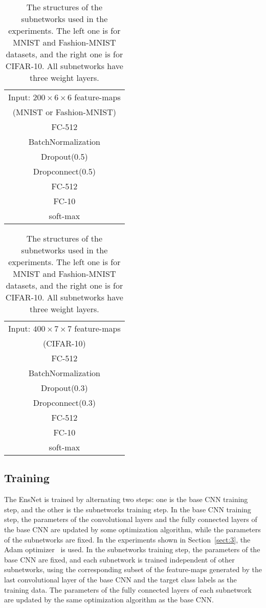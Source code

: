 \documentclass[a4j]{article}
\begin{document}
\begin{table}[t]
  \centering
\caption{The structures of the subnetworks used in the experiments. The left one is for MNIST and Fashion-MNIST datasets, and the right one is for CIFAR-10. All subnetworks have three weight layers.}
  \label{tb:subnet}
  \begin{tabular}[t]{|c|} \hline
      Input: $200\times6\times6$ feature-maps \\ (MNIST or Fashion-MNIST) \\ \hline
      FC-512\\
      BatchNormalization\\
      Dropout(0.5)\\ \hline
      Dropconnect(0.5)\\
      FC-512\\ \hline
      FC-10\\ \hline
      soft-max\\ \hline
\end{tabular}
  \begin{tabular}[t]{|c|} \hline
      Input: $400\times7\times7$ feature-maps \\ (CIFAR-10)\\ \hline
      FC-512\\
      BatchNormalization\\
      Dropout(0.3)\\ \hline
      Dropconnect(0.3)\\
      FC-512\\ \hline
      FC-10\\ \hline
      soft-max\\ \hline
\end{tabular}
\end{table}

\subsection{Training}
The EnsNet is trained by alternating two steps: one is the base CNN training step, and the other is the subnetworks training step. In the base CNN training step, the parameters of the convolutional layers and the fully connected layers of the base CNN are updated by some optimization algorithm, while the parameters of the subnetworks are fixed. In the experiments shown in Section~\ref{sect:3}, the Adam optimizer~\cite{Adam} is used. In the subnetworks training step, the parameters of the base CNN are fixed, and each subnetwork is trained independent of other subnetworks, using the corresponding subset of the feature-maps generated by the last convolutional layer of the base CNN and the target class labels as the training data. The parameters of the fully connected layers of each subnetwork are updated by the same optimization algorithm as the base CNN.
\end{document}
